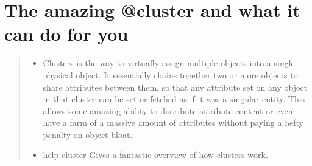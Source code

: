 \documentclass[letterpaper,10pt,english]{sphinxmanual}
\begin{document}
\section{The amazing @cluster and what it can do for you}
\label{\detokenize{12-advanced:the-amazing-cluster-and-what-it-can-do-for-you}}\begin{quote}
\begin{itemize}
\item {} 
\sphinxAtStartPar
Clusters is the way to virtually assign multiple objects into
a single physical object.  It essentially chains together two
or more objects to share attributes between them, so that any
attribute set on any object in that cluster can be set or fetched
as if it was a singular entity.  This allows some amazing ability
to distribute attribute content or even have a farm of a massive
amount of attributes without paying a hefty penalty on object bloat.

\end{itemize}
\begin{itemize}
\item {} 
\sphinxAtStartPar
help cluster  \textendash{} Gives a fantastic overview of how clusters work.

\end{itemize}
\end{quote}
\end{document}
